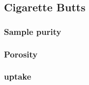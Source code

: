\subsection{Cigarette Butts}
\label{ss:cigarette_butts}

\subsubsection{Sample purity}


\subsubsection{Porosity}

\subsubsection{ uptake}